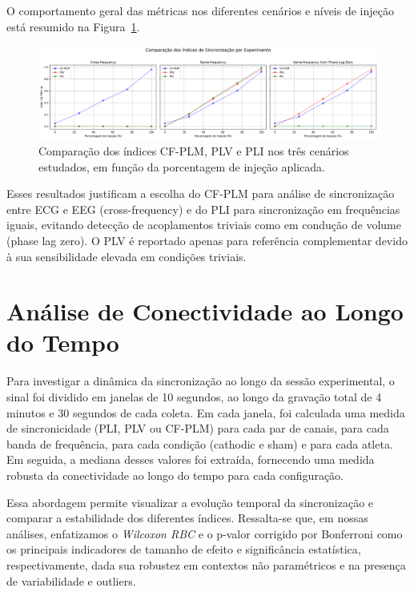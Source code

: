 O comportamento geral das métricas nos diferentes cenários e níveis de injeção está resumido na Figura~\ref{fig:comparativo_metricas}.

\begin{figure}[htb]
    \centering
    \includegraphics[width=\textwidth]{figs/3_2_testing_connectivity_metrics/17_Comparativo_Subplots_Experimentos.png}
    \caption{Comparação dos índices CF-PLM, PLV e PLI nos três cenários estudados, em função da porcentagem de injeção aplicada.}
    \label{fig:comparativo_metricas}
\end{figure}

Esses resultados justificam a escolha do CF-PLM para análise de sincronização entre ECG e EEG (cross-frequency) e do PLI para sincronização em frequências iguais, evitando detecção de acoplamentos triviais como em condução de volume (phase lag zero). O PLV é reportado apenas para referência complementar devido à sua sensibilidade elevada em condições triviais.

\section{Análise de Conectividade ao Longo do Tempo}
\label{sec:connectivity_over_time}

Para investigar a dinâmica da sincronização ao longo da sessão experimental, o sinal foi dividido em janelas de 10 segundos, ao longo da gravação total de 4 minutos e 30 segundos de cada coleta. Em cada janela, foi calculada uma medida de sincronicidade (PLI, PLV ou CF-PLM) para cada par de canais, para cada banda de frequência, para cada condição (cathodic e sham) e para cada atleta. Em seguida, a mediana desses valores foi extraída, fornecendo uma medida robusta da conectividade ao longo do tempo para cada configuração.

Essa abordagem permite visualizar a evolução temporal da sincronização e comparar a estabilidade dos diferentes índices. Ressalta-se que, em nossas análises, enfatizamos o \emph{Wilcoxon RBC} e o p-valor corrigido por Bonferroni como os principais indicadores de tamanho de efeito e significância estatística, respectivamente, dada sua robustez em contextos não paramétricos e na presença de variabilidade e outliers.

